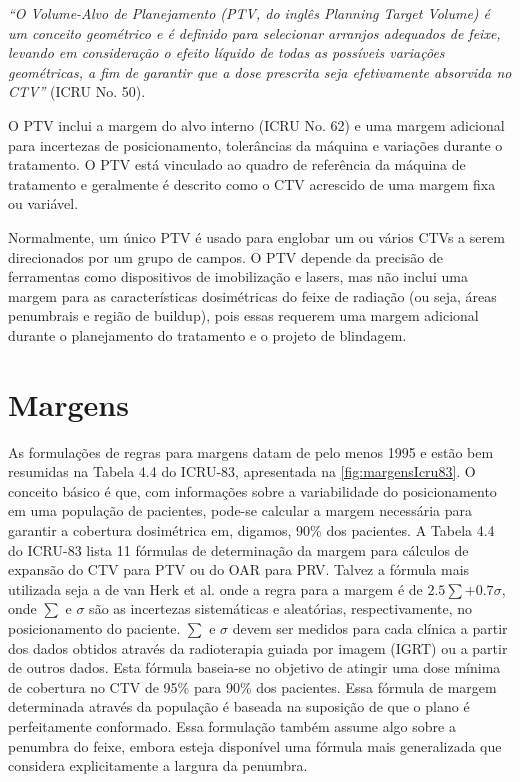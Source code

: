 \documentclass[11pt,a4paper]{article}
\begin{document}
	\textit{``O Volume-Alvo de Planejamento (PTV, do inglês Planning Target Volume) é um conceito geométrico e é definido para selecionar arranjos adequados de feixe, levando em consideração o efeito líquido de todas as possíveis variações geométricas, a fim de garantir que a dose prescrita seja efetivamente absorvida no CTV''} (ICRU No. 50).

	O PTV inclui a margem do alvo interno (ICRU No. 62) e uma margem adicional para incertezas de posicionamento, tolerâncias da máquina e variações durante o tratamento. O PTV está vinculado ao quadro de referência da máquina de tratamento e geralmente é descrito como o CTV acrescido de uma margem fixa ou variável.

	Normalmente, um único PTV é usado para englobar um ou vários CTVs a serem direcionados por um grupo de campos. O PTV depende da precisão de ferramentas como dispositivos de imobilização e lasers, mas não inclui uma margem para as características dosimétricas do feixe de radiação (ou seja, áreas penumbrais e região de buildup), pois essas requerem uma margem adicional durante o planejamento do tratamento e o projeto de blindagem.

\section{Margens}

	As formulações de regras para margens datam de pelo menos 1995 e estão bem resumidas na Tabela 4.4 do ICRU-83, apresentada na \ref{fig:margensIcru83}. O conceito básico é que, com informações sobre a variabilidade do posicionamento em uma população de pacientes, pode-se calcular a margem necessária para garantir a cobertura dosimétrica em, digamos, 90\% dos pacientes. A Tabela 4.4 do ICRU-83 lista 11 fórmulas de determinação da margem para cálculos de expansão do CTV para PTV ou do OAR para PRV. Talvez a fórmula mais utilizada seja a de van Herk et al. onde a regra para a margem é de $2.5\sum + 0.7\sigma$, onde $\sum$ e $\sigma$ são as incertezas sistemáticas e aleatórias, respectivamente, no posicionamento do paciente. $\sum$ e $\sigma$ devem ser medidos para cada clínica a partir dos dados obtidos através da radioterapia guiada por imagem (IGRT) ou a partir de outros dados. Esta fórmula baseia-se no objetivo de atingir uma dose mínima de cobertura no CTV de 95\% para 90\% dos pacientes. Essa fórmula de margem determinada através da população é baseada na suposição de que o plano é perfeitamente conformado. Essa formulação também assume algo sobre a penumbra do feixe, embora esteja disponível uma fórmula mais generalizada que considera explicitamente a largura da penumbra.
\end{document}
